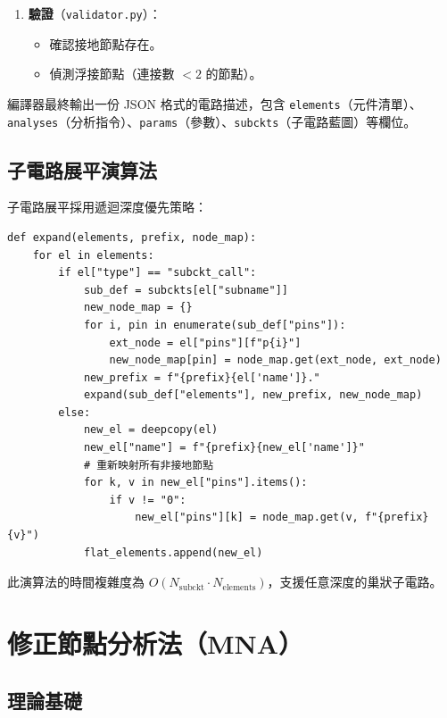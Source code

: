 \documentclass[12pt,a4paper]{article}
\begin{document}
\begin{enumerate}
  \item \textbf{驗證}（\texttt{validator.py}）：
    \begin{itemize}
      \item 確認接地節點存在。
      \item 偵測浮接節點（連接數 $< 2$ 的節點）。
    \end{itemize}
\end{enumerate}

編譯器最終輸出一份 JSON 格式的電路描述，包含 \texttt{elements}（元件清單）、\texttt{analyses}（分析指令）、\texttt{params}（參數）、\texttt{subckts}（子電路藍圖）等欄位。

\subsection{子電路展平演算法}

子電路展平採用遞迴深度優先策略：

\begin{lstlisting}[language=PythonSPICE,caption={子電路展平核心邏輯}]
def expand(elements, prefix, node_map):
    for el in elements:
        if el["type"] == "subckt_call":
            sub_def = subckts[el["subname"]]
            new_node_map = {}
            for i, pin in enumerate(sub_def["pins"]):
                ext_node = el["pins"][f"p{i}"]
                new_node_map[pin] = node_map.get(ext_node, ext_node)
            new_prefix = f"{prefix}{el['name']}."
            expand(sub_def["elements"], new_prefix, new_node_map)
        else:
            new_el = deepcopy(el)
            new_el["name"] = f"{prefix}{new_el['name']}"
            # 重新映射所有非接地節點
            for k, v in new_el["pins"].items():
                if v != "0":
                    new_el["pins"][k] = node_map.get(v, f"{prefix}{v}")
            flat_elements.append(new_el)
\end{lstlisting}

此演算法的時間複雜度為 $O(N_{\text{subckt}} \cdot N_{\text{elements}})$，支援任意深度的巢狀子電路。


\section{修正節點分析法（MNA）}

\subsection{理論基礎}
\end{document}
